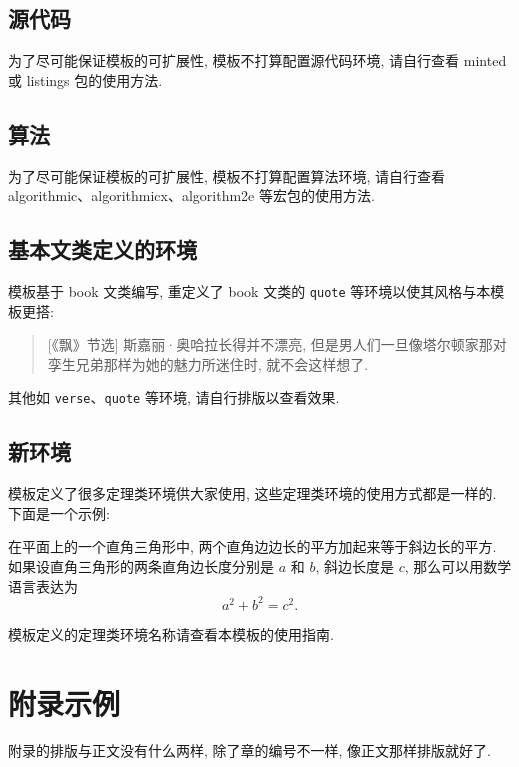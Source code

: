 \documentclass[final]{ncuthesis}
\begin{document}
\section{源代码}
为了尽可能保证模板的可扩展性, 模板不打算配置源代码环境, 请自行查看 \textsf{minted} 或 \textsf{listings} 包的使用方法. 
\section{算法}
为了尽可能保证模板的可扩展性, 模板不打算配置算法环境, 请自行查看 \textsf{algorithmic}、\textsf{algorithmicx}、\textsf{algorithm2e} 等宏包的使用方法. 
\section{基本文类定义的环境}
模板基于 \textsf{book} 文类编写, 重定义了 \textsf{book} 文类的 \verb|quote| 等环境以使其风格与本模板更搭: 
\begin{quotation}[《飘》节选]
斯嘉丽·奥哈拉长得并不漂亮, 但是男人们一旦像塔尔顿家那对孪生兄弟那样为她的魅力所迷住时, 就不会这样想了. 
\end{quotation}
其他如 \verb|verse|、\verb|quote| 等环境, 请自行排版以查看效果. 
\section{新环境}
模板定义了很多定理类环境供大家使用, 这些定理类环境的使用方式都是一样的. 下面是一个示例: 
\begin{theorem}[勾股定理]\label{thm:gougu}
在平面上的一个直角三角形中, 两个直角边边长的平方加起来等于斜边长的平方. 如果设直角三角形的两条直角边长度分别是 $a$ 和 $b$, 斜边长度是 $c$, 那么可以用数学语言表达为
\begin{equation}
  a^2 +b^2 = c^2.
\end{equation}
\end{theorem}
模板定义的定理类环境名称请查看本模板的使用指南. 
\appendix
\chapter{附录示例}
附录的排版与正文没有什么两样, 除了章的编号不一样, 像正文那样排版就好了. 
\end{document}
